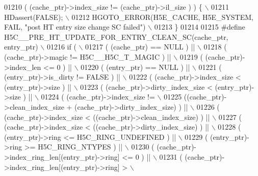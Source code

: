 \begin{DoxyCode}
01210 \textcolor{preprocessor}{     ( (cache\_ptr)->index\_size != (cache\_ptr)->il\_size ) ) \{              \(\backslash\)}
01211 \textcolor{preprocessor}{    HDassert(FALSE);                                                      \(\backslash\)}
01212 \textcolor{preprocessor}{    HGOTO\_ERROR(H5E\_CACHE, H5E\_SYSTEM, FAIL, "post HT entry size change SC failed") \(\backslash\)}
01213 \textcolor{preprocessor}{\}}
01214 
01215 \textcolor{preprocessor}{#define H5C\_\_PRE\_HT\_UPDATE\_FOR\_ENTRY\_CLEAN\_SC(cache\_ptr, entry\_ptr)           \(\backslash\)}
01216 \textcolor{preprocessor}{if (                                                                          \(\backslash\)}
01217 \textcolor{preprocessor}{    ( (cache\_ptr) == NULL ) ||                                                \(\backslash\)}
01218 \textcolor{preprocessor}{    ( (cache\_ptr)->magic != H5C\_\_H5C\_T\_MAGIC ) ||                             \(\backslash\)}
01219 \textcolor{preprocessor}{    ( (cache\_ptr)->index\_len <= 0 ) ||                                        \(\backslash\)}
01220 \textcolor{preprocessor}{    ( (entry\_ptr) == NULL ) ||                                                \(\backslash\)}
01221 \textcolor{preprocessor}{    ( (entry\_ptr)->is\_dirty != FALSE ) ||                                     \(\backslash\)}
01222 \textcolor{preprocessor}{    ( (cache\_ptr)->index\_size < (entry\_ptr)->size ) ||                        \(\backslash\)}
01223 \textcolor{preprocessor}{    ( (cache\_ptr)->dirty\_index\_size < (entry\_ptr)->size ) ||                  \(\backslash\)}
01224 \textcolor{preprocessor}{    ( (cache\_ptr)->index\_size !=                                              \(\backslash\)}
01225 \textcolor{preprocessor}{       ((cache\_ptr)->clean\_index\_size + (cache\_ptr)->dirty\_index\_size) ) ||   \(\backslash\)}
01226 \textcolor{preprocessor}{    ( (cache\_ptr)->index\_size < ((cache\_ptr)->clean\_index\_size) ) ||          \(\backslash\)}
01227 \textcolor{preprocessor}{    ( (cache\_ptr)->index\_size < ((cache\_ptr)->dirty\_index\_size) ) ||          \(\backslash\)}
01228 \textcolor{preprocessor}{    ( (entry\_ptr)->ring <= H5C\_RING\_UNDEFINED ) ||                            \(\backslash\)}
01229 \textcolor{preprocessor}{    ( (entry\_ptr)->ring >= H5C\_RING\_NTYPES ) ||                               \(\backslash\)}
01230 \textcolor{preprocessor}{    ( (cache\_ptr)->index\_ring\_len[(entry\_ptr)->ring] <= 0 ) ||                \(\backslash\)}
01231 \textcolor{preprocessor}{    ( (cache\_ptr)->index\_ring\_len[(entry\_ptr)->ring] >                        \(\backslash\)}

\end{DoxyCode}
